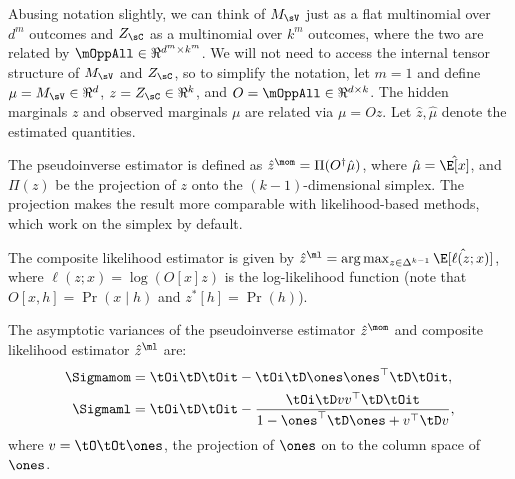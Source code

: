 Abusing notation slightly, we can think of $M_\sV$ just as a flat multinomial over $d^m$ outcomes
and $Z_\sC$ as a multinomial over $k^m$ outcomes, where the two are related by
$\mOppAll \in \Re^{d^m \times k^m}$.
We will not need to access the internal tensor structure of $M_\sV$ and $Z_\sC$,
so to simplify the notation, let $m=1$
and define $\mu = M_\sV \in \Re^d$,
$z = Z_\sC \in \Re^k$,
and $O = \mOppAll \in \Re^{d \times k}$.
The hidden marginals $z$ and observed marginals $\mu$ are related via $\mu = O z$.
Let $\hat z,\hat\mu$ denote the estimated quantities.

The pseudoinverse estimator is defined as $\hat z^\mom = \Pi(O^\dagger \hat\mu)$,
where $\hat\mu = \hat\E[x]$, and $\Pi(z)$ be the projection of $z$ onto the
$(k-1)$-dimensional simplex.  The projection makes the result more comparable with likelihood-based methods,
which work on the simplex by default.

The composite likelihood estimator is given by $\hat z^\ml = \arg\max_{z \in \Delta^{k-1}} \hat\E[\ell(z; x)]$,
where $\ell(z; x) = \log(O[x] z)$ is the log-likelihood function
(note that $O[x, h] = \Pr(x \mid h)$ and $z^*[h] = \Pr(h)$).

\begin{lemma}
  \label{lem:mom-pw-variance}
  The asymptotic variances of the pseudoinverse estimator $\hat z^\mom$
  and composite likelihood estimator $\hat z^\ml$ are:
  \begin{align*}
    \Sigmamom 
      &= \tOi \tD \tOit - \tOi \tD \ones \ones^\top \tD \tOit, \\
    \Sigmaml 
      &=\tOi \tD \tOit 
        - \frac{\tOi \tD v v^\top \tD \tOit }
        {1 - \ones^\top \tD \ones + v^\top \tD v },
  \end{align*}
  where $v = \tO \tOt \ones$, the projection of $\ones$ on to the column
  space of $\ones$.
\end{lemma}

